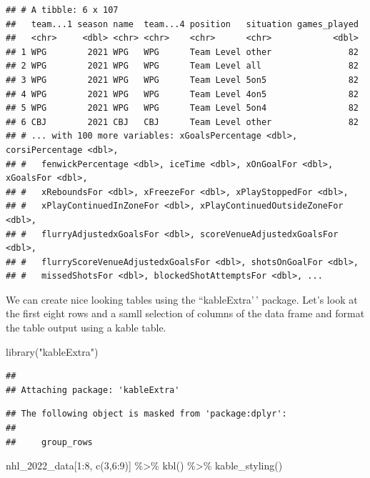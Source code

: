 \documentclass[
]{book}
\newenvironment{Shaded}{\begin{snugshade}}{\end{snugshade}}
\newcommand{\DecValTok}[1]{\textcolor[rgb]{0.00,0.00,0.81}{#1}}
\newcommand{\FunctionTok}[1]{\textcolor[rgb]{0.00,0.00,0.00}{#1}}
\newcommand{\NormalTok}[1]{#1}
\newcommand{\SpecialCharTok}[1]{\textcolor[rgb]{0.00,0.00,0.00}{#1}}
\newcommand{\StringTok}[1]{\textcolor[rgb]{0.31,0.60,0.02}{#1}}
\theoremstyle{definition}
\theoremstyle{definition}
\theoremstyle{definition}
\theoremstyle{definition}
\theoremstyle{remark}
\begin{document}
\begin{verbatim}
## # A tibble: 6 x 107
##   team...1 season name  team...4 position   situation games_played
##   <chr>     <dbl> <chr> <chr>    <chr>      <chr>            <dbl>
## 1 WPG        2021 WPG   WPG      Team Level other               82
## 2 WPG        2021 WPG   WPG      Team Level all                 82
## 3 WPG        2021 WPG   WPG      Team Level 5on5                82
## 4 WPG        2021 WPG   WPG      Team Level 4on5                82
## 5 WPG        2021 WPG   WPG      Team Level 5on4                82
## 6 CBJ        2021 CBJ   CBJ      Team Level other               82
## # ... with 100 more variables: xGoalsPercentage <dbl>, corsiPercentage <dbl>,
## #   fenwickPercentage <dbl>, iceTime <dbl>, xOnGoalFor <dbl>, xGoalsFor <dbl>,
## #   xReboundsFor <dbl>, xFreezeFor <dbl>, xPlayStoppedFor <dbl>,
## #   xPlayContinuedInZoneFor <dbl>, xPlayContinuedOutsideZoneFor <dbl>,
## #   flurryAdjustedxGoalsFor <dbl>, scoreVenueAdjustedxGoalsFor <dbl>,
## #   flurryScoreVenueAdjustedxGoalsFor <dbl>, shotsOnGoalFor <dbl>,
## #   missedShotsFor <dbl>, blockedShotAttemptsFor <dbl>, ...
\end{verbatim}

We can create nice looking tables using the ``kableExtra'\,' package. Let's look at the first eight rows and a samll selection of columns of the data frame and format the table output using a kable table.

\begin{Shaded}
\begin{Highlighting}[]
\FunctionTok{library}\NormalTok{(}\StringTok{"kableExtra"}\NormalTok{)}
\end{Highlighting}
\end{Shaded}

\begin{verbatim}
## 
## Attaching package: 'kableExtra'
\end{verbatim}

\begin{verbatim}
## The following object is masked from 'package:dplyr':
## 
##     group_rows
\end{verbatim}

\begin{Shaded}
\begin{Highlighting}[]
\NormalTok{nhl\_2022\_data[}\DecValTok{1}\SpecialCharTok{:}\DecValTok{8}\NormalTok{, }\FunctionTok{c}\NormalTok{(}\DecValTok{3}\NormalTok{,}\DecValTok{6}\SpecialCharTok{:}\DecValTok{9}\NormalTok{)] }\SpecialCharTok{\%\textgreater{}\%} \FunctionTok{kbl}\NormalTok{() }\SpecialCharTok{\%\textgreater{}\%} \FunctionTok{kable\_styling}\NormalTok{()}
\end{Highlighting}
\end{Shaded}
\end{document}
